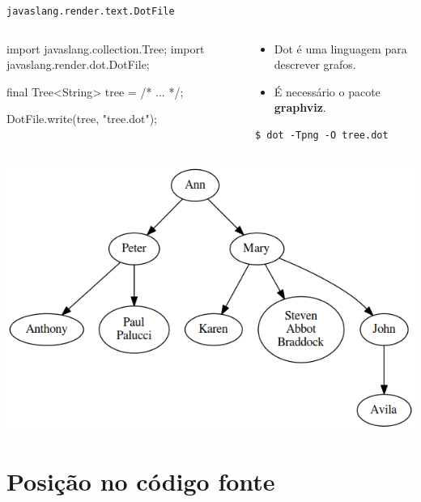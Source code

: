 \documentclass[smaller]{beamer}
\begin{document}
\begin{frame}{\texttt{javaslang.render.text.DotFile}}
  \small
  \begin{columns}[t]
    \begin{column}{.5\textwidth}
\begin{pygmented}[]
import javaslang.collection.Tree;
import javaslang.render.dot.DotFile;

final Tree<String> tree = /* ... */;

DotFile.write(tree, "tree.dot");
\end{pygmented}
    \end{column}
    \begin{column}{.5\textwidth}
      \begin{itemize}
        \item Dot é uma linguagem para descrever grafos.
        \item É necessário o pacote \textbf{graphviz}.
      \end{itemize}
\begin{Verbatim}[frame=single]
$ dot -Tpng -O tree.dot
\end{Verbatim}
    \end{column}
  \end{columns}
  \begin{center}
    \includegraphics[scale=.35]{images/tree.png}
  \end{center}
\end{frame}

\section{Posição no código fonte}
\end{document}
